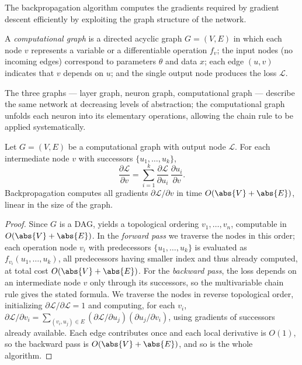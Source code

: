 The backpropagation algorithm computes the gradients required by gradient descent
efficiently by exploiting the graph structure of the network.

\begin{definition}
\label{def:found:compgraph}
A \emph{computational graph} is a directed acyclic graph $G = (V, E)$ in which
each node $v$ represents a variable or a differentiable operation $f_v$; the
input nodes (no incoming edges) correspond to parameters $\theta$ and data $x$;
each edge $(u, v)$ indicates that $v$ depends on $u$; and the single output node
produces the loss $\mathcal{L}$.
\end{definition}

The three graphs --- layer graph, neuron graph, computational graph --- describe
the same network at decreasing levels of abstraction; the computational graph
unfolds each neuron into its elementary operations, allowing the chain rule to be
applied systematically.

\begin{theorem}
\label{thm:found:backprop}
Let $G = (V, E)$ be a computational graph with output node $\mathcal{L}$. For
each intermediate node $v$ with successors $\{u_1, \ldots, u_k\}$,
\[
  \frac{\partial \mathcal{L}}{\partial v}
  = \sum_{i=1}^k \frac{\partial \mathcal{L}}{\partial u_i}\,
  \frac{\partial u_i}{\partial v}.
\]
Backpropagation computes all gradients $\partial\mathcal{L}/\partial v$ in time
$O(\abs{V} + \abs{E})$, linear in the size of the graph.
\end{theorem}

\begin{proof}
Since $G$ is a DAG,  yields a topological ordering
$v_1, \ldots, v_n$, computable in $O(\abs{V} + \abs{E})$. In the \emph{forward
pass} we traverse the nodes in this order; each operation node $v_i$ with
predecessors $\{u_1, \ldots, u_k\}$ is evaluated as $f_{v_i}(u_1, \ldots, u_k)$,
all predecessors having smaller index and thus already computed, at total cost
$O(\abs{V} + \abs{E})$. For the \emph{backward pass}, the loss depends on an
intermediate node $v$ only through its successors, so the multivariable chain
rule gives the stated formula. We traverse the nodes in reverse topological
order, initializing $\partial\mathcal{L}/\partial\mathcal{L} = 1$ and computing,
for each $v_i$, $\partial\mathcal{L}/\partial v_i = \sum_{(v_i, u_j) \in E}
(\partial\mathcal{L}/\partial u_j)(\partial u_j/\partial v_i)$, using gradients
of successors already available. Each edge contributes once and each local
derivative is $O(1)$, so the backward pass is $O(\abs{V} + \abs{E})$, and so is
the whole algorithm.
\end{proof}

